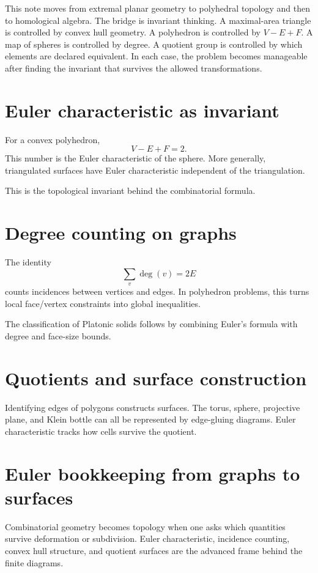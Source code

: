 This note moves from extremal planar geometry to polyhedral topology and then to homological algebra.  The bridge is invariant thinking.  A maximal-area triangle is controlled by convex hull geometry.  A polyhedron is controlled by $V-E+F$.  A map of spheres is controlled by degree.  A quotient group is controlled by which elements are declared equivalent.  In each case, the problem becomes manageable after finding the invariant that survives the allowed transformations.

\section{Euler characteristic as invariant}

For a convex polyhedron,
\[
  V-E+F=2.
\]
This number is the Euler characteristic of the sphere.  More generally, triangulated surfaces have Euler characteristic independent of the triangulation.

This is the topological invariant behind the combinatorial formula.

\section{Degree counting on graphs}

The identity
\[
  \sum_v \deg(v)=2E
\]
counts incidences between vertices and edges.  In polyhedron problems, this turns local face/vertex constraints into global inequalities.

The classification of Platonic solids follows by combining Euler's formula with degree and face-size bounds.

\section{Quotients and surface construction}

Identifying edges of polygons constructs surfaces.  The torus, sphere, projective plane, and Klein bottle can all be represented by edge-gluing diagrams.  Euler characteristic tracks how cells survive the quotient.

\section{Euler bookkeeping from graphs to surfaces}

Combinatorial geometry becomes topology when one asks which quantities survive deformation or subdivision.  Euler characteristic, incidence counting, convex hull structure, and quotient surfaces are the advanced frame behind the finite diagrams.

